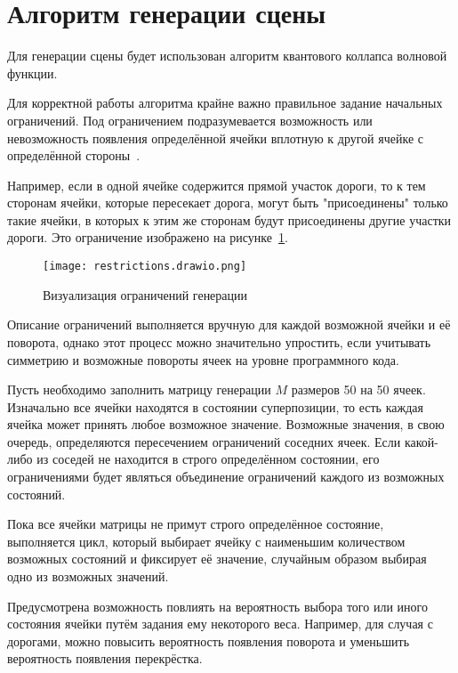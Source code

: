 \section{Алгоритм генерации сцены}

Для генерации сцены будет использован алгоритм квантового коллапса волновой функции. 

Для корректной работы алгоритма крайне важно правильное задание начальных ограничений. Под ограничением подразумевается возможность или невозможность появления определённой ячейки вплотную к другой ячейке с определённой стороны~\cite{QWFC}.

Например, если в одной ячейке содержится прямой участок дороги, то к тем сторонам ячейки, которые пересекает дорога, могут быть "присоединены" только такие ячейки, в которых к этим же сторонам будут присоединены другие участки дороги. Это ограничение изображено на рисунке~\ref{fig:restrictions}.

\begin{figure}[h!]
    \centering
    \texttt{[image: restrictions.drawio.png]}
    \caption{Визуализация ограничений генерации}
    \label{fig:restrictions}
\end{figure}

Описание ограничений выполняется вручную для каждой возможной ячейки и её поворота, однако этот процесс можно значительно упростить, если учитывать симметрию и возможные повороты ячеек на уровне программного кода. 

Пусть необходимо заполнить матрицу генерации $M$ размеров 50 на 50 ячеек. Изначально все ячейки находятся в состоянии суперпозиции, то есть каждая ячейка может принять любое возможное значение. Возможные значения, в свою очередь, определяются пересечением ограничений соседних ячеек. Если какой-либо из соседей не находится в строго определённом состоянии, его ограничениями будет являться объединение ограничений каждого из возможных состояний.

Пока все ячейки матрицы не примут строго определённое состояние, выполняется цикл, который выбирает ячейку с наименьшим количеством возможных состояний и фиксирует её значение, случайным образом выбирая одно из возможных значений.

Предусмотрена возможность повлиять на вероятность выбора того или иного состояния ячейки путём задания ему некоторого веса. Например, для случая с дорогами, можно повысить вероятность появления поворота и уменьшить вероятность появления перекрёстка.


